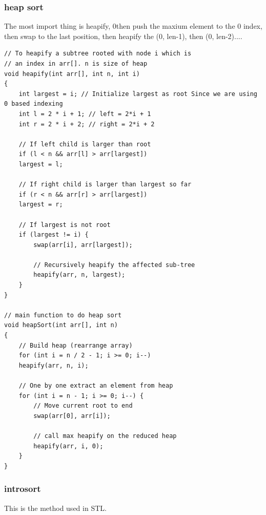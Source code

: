 \documentclass[a4paper,11pt,twoside]{book}
\begin{document}
\subsubsection{heap sort}

\par The most import thing is heapify, 0then push the maxium element to the 0 index, then swap to the last position, then heapify the (0, len-1), then (0, len-2)....
\begin{lstlisting}
// To heapify a subtree rooted with node i which is
// an index in arr[]. n is size of heap
void heapify(int arr[], int n, int i)
{
	int largest = i; // Initialize largest as root Since we are using 0 based indexing
	int l = 2 * i + 1; // left = 2*i + 1
	int r = 2 * i + 2; // right = 2*i + 2
	
	// If left child is larger than root
	if (l < n && arr[l] > arr[largest])
	largest = l;
	
	// If right child is larger than largest so far
	if (r < n && arr[r] > arr[largest])
	largest = r;
	
	// If largest is not root
	if (largest != i) {
		swap(arr[i], arr[largest]);
		
		// Recursively heapify the affected sub-tree
		heapify(arr, n, largest);
	}
}

// main function to do heap sort
void heapSort(int arr[], int n)
{
	// Build heap (rearrange array)
	for (int i = n / 2 - 1; i >= 0; i--)
	heapify(arr, n, i);
	
	// One by one extract an element from heap
	for (int i = n - 1; i >= 0; i--) {
		// Move current root to end
		swap(arr[0], arr[i]);
		
		// call max heapify on the reduced heap
		heapify(arr, i, 0);
	}
}

\end{lstlisting}



\subsubsection{introsort}

\par This is the method used in STL.
\end{document}
